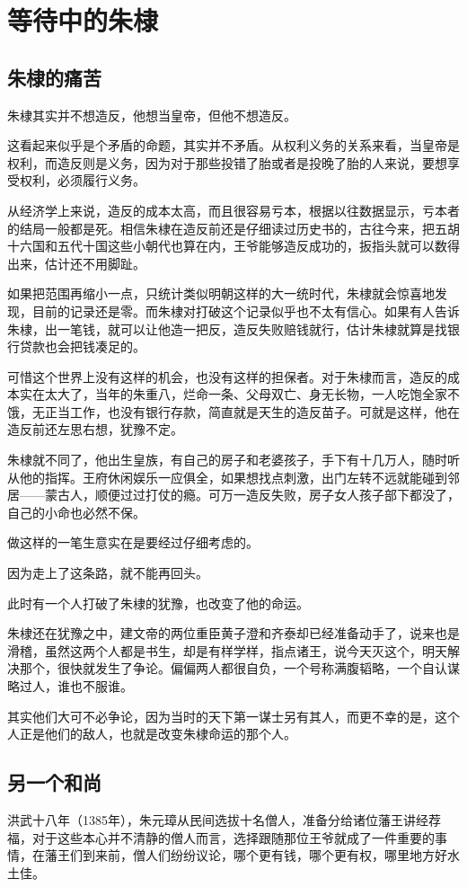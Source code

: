 \section{等待中的朱棣}
\ifnum{}
	\begin{multicols}{\theparacolNo}
		\fi
		\subsection{朱棣的痛苦}
		朱棣其实并不想造反，他想当皇帝，但他不想造反。

		这看起来似乎是个矛盾的命题，其实并不矛盾。从权利义务的关系来看，当皇帝是权利，而造反则是义务，因为对于那些投错了胎或者是投晚了胎的人来说，要想享受权利，必须履行义务。

		从经济学上来说，造反的成本太高，而且很容易亏本，根据以往数据显示，亏本者的结局一般都是死。相信朱棣在造反前还是仔细读过历史书的，古往今来，把五胡十六国和五代十国这些小朝代也算在内，王爷能够造反成功的，扳指头就可以数得出来，估计还不用脚趾。

		如果把范围再缩小一点，只统计类似明朝这样的大一统时代，朱棣就会惊喜地发现，目前的记录还是零。而朱棣对打破这个记录似乎也不太有信心。如果有人告诉朱棣，出一笔钱，就可以让他造一把反，造反失败赔钱就行，估计朱棣就算是找银行贷款也会把钱凑足的。

		可惜这个世界上没有这样的机会，也没有这样的担保者。对于朱棣而言，造反的成本实在太大了，当年的朱重八，烂命一条、父母双亡、身无长物，一人吃饱全家不饿，无正当工作，也没有银行存款，简直就是天生的造反苗子。可就是这样，他在造反前还左思右想，犹豫不定。

		朱棣就不同了，他出生皇族，有自己的房子和老婆孩子，手下有十几万人，随时听从他的指挥。王府休闲娱乐一应俱全，如果想找点刺激，出门左转不远就能碰到邻居——蒙古人，顺便过过打仗的瘾。可万一造反失败，房子女人孩子部下都没了，自己的小命也必然不保。

		做这样的一笔生意实在是要经过仔细考虑的。

		因为走上了这条路，就不能再回头。

		此时有一个人打破了朱棣的犹豫，也改变了他的命运。

		朱棣还在犹豫之中，建文帝的两位重臣黄子澄和齐泰却已经准备动手了，说来也是滑稽，虽然这两个人都是书生，却是有样学样，指点诸王，说今天灭这个，明天解决那个，很快就发生了争论。偏偏两人都很自负，一个号称满腹韬略，一个自认谋略过人，谁也不服谁。

		其实他们大可不必争论，因为当时的天下第一谋士另有其人，而更不幸的是，这个人正是他们的敌人，也就是改变朱棣命运的那个人。

		\subsection{另一个和尚}
		洪武十八年（1385年），朱元璋从民间选拔十名僧人，准备分给诸位藩王讲经荐福，对于这些本心并不清静的僧人而言，选择跟随那位王爷就成了一件重要的事情，在藩王们到来前，僧人们纷纷议论，哪个更有钱，哪个更有权，哪里地方好水土佳。


\end{multicols}
